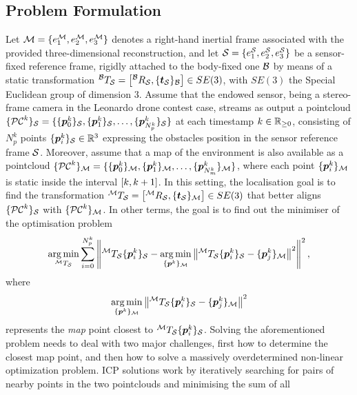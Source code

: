 \subsection{Problem Formulation}
Let $\mathcal{M} = \{ e^{\mathcal{M}}_1, e^{\mathcal{M}}_2, e^{\mathcal{M}}_3 \}$ denotes a right-hand inertial frame associated with the provided three-dimensional reconstruction,
and let $\mathcal{S} = \{ e^{\mathcal{S}}_1, e^{\mathcal{S}}_2, e^{\mathcal{S}}_3 \}$ be a sensor-fixed reference frame, rigidly attached to the body-fixed one $\mathcal{B}$
by means of a static transformation $^{\mathcal{B}}T_{\mathcal{S}} = \left[ ^{\mathcal{B}}R_{\mathcal{S}}, \{\boldsymbol{t}_{\mathcal{S}}\}_{\mathcal{B}} \right] \in SE(3)$, with $SE(3)$ the Special Euclidean group
of dimension $3$. Assume that the endowed sensor, being a stereo-frame camera in the Leonardo drone contest case, streams as output a pointcloud
$\{\mathcal{PC}^k\}_{\mathcal{S}} = \{ \{\boldsymbol{p}^k_0\}_{\mathcal{S}}, \{\boldsymbol{p}^k_1\}_{\mathcal{S}}, \dots, \{\boldsymbol{p}^k_{N_p^k}\}_{\mathcal{S}} \}$ at each timestamp $k \in \mathbb{R}_{\ge 0}$, consisting of
$N_p^k$ points $\{\boldsymbol{p}^k_i\}_{\mathcal{S}} \in \mathbb{R}^{3}$ expressing the obstacles position in the sensor reference frame $\mathcal{S}$.
Moreover, assume that a map of the environment is also available as a pointcloud $\{\mathcal{PC}^k\}_{\mathcal{M}} = \{ \{\boldsymbol{p}^k_0\}_{\mathcal{M}},
\{\boldsymbol{p}^k_1 \}_{\mathcal{M}}, \dots, \{\boldsymbol{p}^k_{N_m^k} \}_{\mathcal{M}} \}$, where each point $\{\boldsymbol{p}^k_i \}_{\mathcal{M}}$ is static inside the interval $\left[ k, k+1 \right]$.
In this setting, the localisation goal is to find the transformation $^{\mathcal{M}}T_{\mathcal{S}} = \left[ ^{\mathcal{M}}R_{\mathcal{S}}, \{\boldsymbol{t}_{\mathcal{S}}\}_{\mathcal{M}} \right] \in SE(3)$
that better aligns $\{\mathcal{PC}^k\}_{\mathcal{S}}$ with $\{\mathcal{PC}^k\}_{\mathcal{M}}$. In other terms, the goal is to find out the minimiser of the optimisation problem
\begin{equation}
    \label{EQ:LOCALISATION-OPTIMISATION-COMPLEX}
    \operatorname*{arg\,min}_{^{\mathcal{M}}T_{\mathcal{S}}} \sum_{i = 0}^{N_p^k} \left \lVert {^{\mathcal{M}}T_{\mathcal{S}} \{\boldsymbol{p}^k_i\}_{\mathcal{S}} - 
                            \operatorname*{arg\,min}_{\{\boldsymbol{p}^k \}_{\mathcal{M}}} \left \lVert {^{\mathcal{M}}T_{\mathcal{S}} \{\boldsymbol{p}^k_i\}_{\mathcal{S}} - \{\boldsymbol{p}^k_j \}_{\mathcal{M}}} \right \rVert^2} \right \rVert^2,
\end{equation}
where 
\begin{equation*}
    \operatorname*{arg\,min}_{\{\boldsymbol{p}^k \}_{\mathcal{M}}} \left \lVert {^{\mathcal{M}}T_{\mathcal{S}} \{\boldsymbol{p}^k_i\}_{\mathcal{S}} - \{\boldsymbol{p}^k_j \}_{\mathcal{M}}} \right \rVert^2
\end{equation*}
represents the \emph{map} point closest to $^{\mathcal{M}}T_{\mathcal{S}} \{\boldsymbol{p}^k_i\}_{\mathcal{S}}$.
Solving the aforementioned problem needs to deal with two major challenges, first how to determine the closest map point, and
then how to solve a massively overdetermined non-linear optimization problem.
ICP solutions work by iteratively searching for pairs of nearby points in the two pointclouds and minimising the sum of all
